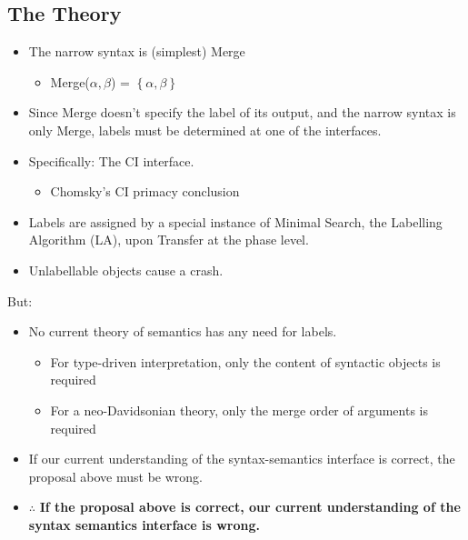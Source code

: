 \documentclass[letterpaper]{article}
\begin{document}
\subsection{The Theory}
\begin{itemize}
  \item The narrow syntax is (simplest) Merge
    \begin{itemize}
      \item Merge($\alpha, \beta$) = $\left\{ \alpha,\beta \right\}$
    \end{itemize}
  \item Since Merge doesn't specify the label of its output, and the narrow syntax is only Merge, labels must be determined at one of the interfaces.
  \item Specifically: The CI interface.
    \begin{itemize}
      \item Chomsky's CI primacy conclusion 
    \end{itemize}
  \item Labels are assigned by a special instance of Minimal Search, the Labelling Algorithm (LA), upon Transfer at the phase level.
  \item Unlabellable objects cause a crash.
\end{itemize}
But:
\begin{itemize}
  \item No current theory of semantics has any need for labels.
    \begin{itemize}
      \item For type-driven interpretation, only the content of syntactic objects is required
      \item For a neo-Davidsonian theory, only the merge order of arguments is required
    \end{itemize}
  \item If our current understanding of the syntax-semantics interface is correct, the proposal above must be wrong.
  \item $\therefore$ \textbf{If the proposal above is correct, our current understanding of the syntax semantics interface is wrong.}
\end{itemize}
\end{document}
